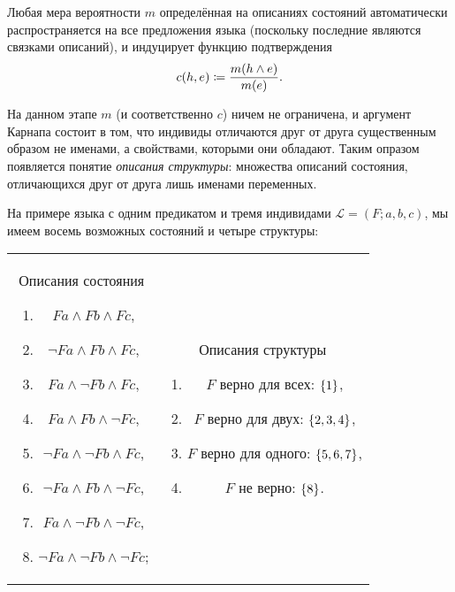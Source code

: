\documentclass[14pt]{extarticle}
\begin{document}
Любая мера вероятности $m$ определённая на описаниях состояний автоматически распространяется на все предложения языка (поскольку последние являются связками описаний), и индуцирует функцию подтверждения
\[
	c(h, e) \coloneqq \frac{m(h\land e)}{m(e)}.
\]

На данном этапе $m$ (и соответственно $c$) ничем не ограничена, и аргумент Карнапа состоит в том, что индивиды отличаются друг от друга существенным образом не именами, а свойствами, которыми они обладают. Таким опразом появляется понятие \emph{описания структуры}: множества описаний состояния, отличающихся друг от друга лишь именами переменных. 

На примере языка с одним предикатом и тремя индивидами $\mathcal{L} = (F; a,b,c)$, мы имеем восемь возможных состояний и четыре структуры:
\begin{table}[h]
\centering
\begin{tabular}{cc}
\begin{minipage}[t]{.3\linewidth}
Описания состояния
\begin{enumerate}
\item $Fa\land Fb\land Fc$,\label{it:allF}
\item $\lnot Fa\land Fb\land Fc$,\label{it:oneFf}
\item $Fa\land \lnot Fb\land Fc$,\label{it:oneFs}
\item $Fa\land Fb\land \lnot Fc$,\label{it:oneFt}
\item $\lnot Fa \land \lnot Fb\land Fc$,\label{it:twoFf}
\item $\lnot Fa \land Fb \land\lnot Fc$,\label{it:twoFs}
\item $Fa \land\lnot Fb \land\lnot Fc$,\label{it:twoFt}
\item $\lnot Fa \land\lnot Fb\land\lnot Fc$;\label{it:noneF}
\end{enumerate}
\end{minipage}
%
&
%
\begin{minipage}[t]{.3\linewidth}
Описания структуры
\begin{enumerate}
\item $F$ верно для всех: $\Set{1}$,
\item $F$ верно для двух: $\Set{2,3,4}$,
\item $F$ верно для одного: $\Set{5,6,7}$,
\item $F$ не верно: $\Set{8}$.
\end{enumerate}
\end{minipage}
\end{tabular}
\end{table}
\end{document}
